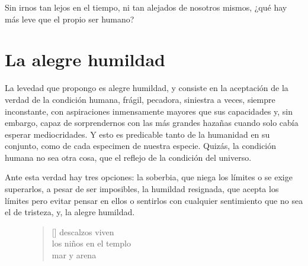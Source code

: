 Sin irnos tan lejos en el tiempo, ni tan alejados de nosotros mismos, ¿qué hay más leve que el propio ser humano? 

\section{La alegre humildad}

La levedad que propongo es alegre humildad, y consiste en la aceptación de la verdad de la condición humana, frágil, pecadora, siniestra a veces, siempre inconstante, con aspiraciones inmensamente mayores que sus capacidades y, sin embargo, capaz de sorprendernos con las más grandes hazañas cuando solo cabía esperar mediocridades. Y esto es predicable tanto de la humanidad en su conjunto, como de cada especimen de nuestra especie. Quizás, la condición humana no sea otra cosa, que el reflejo de la condición del universo.

Ante esta verdad hay tres opciones: la soberbia, que niega los límites o se exige superarlos, a pesar de ser imposibles, la humildad resignada, que acepta los límites pero evitar pensar en ellos o sentirlos con cualquier sentimiento que no sea el de tristeza, y, la alegre humildad.

\begin{figure}
\settowidth{\versewidth}{los niños en el templo}
\begin{verse}[\versewidth]
descalzos viven\\
los niños en el templo\\
\vin mar y arena
\end{verse}
\end{figure}


